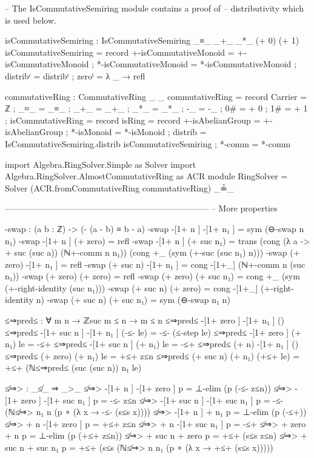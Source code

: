 \documentclass[11pt,a4paper]{article}
\begin{document}
\begin{code}
  -- The IsCommutativeSemiring module contains a proof of
  -- distributivity which is used below.

  isCommutativeSemiring : IsCommutativeSemiring _≡_ _+_ _*_ (+ 0) (+ 1)
  isCommutativeSemiring = record
    { +-isCommutativeMonoid = +-isCommutativeMonoid
    ; *-isCommutativeMonoid = *-isCommutativeMonoid
    ; distribʳ              = distribʳ
    ; zeroˡ                 = λ _ → refl
    }

commutativeRing : CommutativeRing _ _
commutativeRing = record
  { Carrier           = ℤ
  ; _≈_               = _≡_
  ; _+_               = _+_
  ; _*_               = _*_
  ; -_                = -_
  ; 0#                = + 0
  ; 1#                = + 1
  ; isCommutativeRing = record
    { isRing = record
      { +-isAbelianGroup = +-isAbelianGroup
      ; *-isMonoid       = *-isMonoid
      ; distrib          = IsCommutativeSemiring.distrib
                             isCommutativeSemiring
      }
    ; *-comm = *-comm
    }
  }

import Algebra.RingSolver.Simple as Solver
import Algebra.RingSolver.AlmostCommutativeRing as ACR
module RingSolver =
  Solver (ACR.fromCommutativeRing commutativeRing) _≟_

------------------------------------------------------------------------
-- More properties

-swap : (a b : ℤ) -> (- (a - b) ≡ b - a)
-swap -[1+ n ] -[1+ n₁ ] = sym (⊖-swap n n₁)
-swap -[1+ n ] (+ zero) = refl
-swap -[1+ n ] (+ suc n₁) = trans (cong (λ a -> + suc (suc a)) 
  (ℕ+-comm n n₁)) (cong +_ (sym (+-suc (suc n₁) n)))
-swap (+ zero) -[1+ n₁ ] = refl
-swap (+ suc n) -[1+ n₁ ] = cong -[1+_] (ℕ+-comm n (suc n₁))
-swap (+ zero) (+ zero) = refl
-swap (+ zero) (+ suc n₁) = cong +_ (sym (+-right-identity (suc n₁)))
-swap (+ suc n) (+ zero) = cong -[1+_] (+-right-identity n)
-swap (+ suc n) (+ suc n₁) = sym (⊖-swap n₁ n)

≤⇒pred≤ : ∀ m n → ℤsuc m ≤ n → m ≤ n
≤⇒pred≤ -[1+ zero ] -[1+ n₁ ] ()
≤⇒pred≤ -[1+ suc n ] -[1+ n₁ ] (-≤- le) = -≤- (≤-step le)
≤⇒pred≤ -[1+ zero ] (+ n₁) le = -≤+
≤⇒pred≤ -[1+ suc n ] (+ n₁) le = -≤+
≤⇒pred≤ (+ n) -[1+ n₁ ] ()
≤⇒pred≤ (+ zero) (+ n₁) le = +≤+ z≤n
≤⇒pred≤ (+ suc n) (+ n₁) (+≤+ le) = +≤+ (ℕ≤⇒pred≤ (suc (suc n)) n₁ le)

≰⇒> : _≰_ ⇒ _>_
≰⇒> { -[1+ n ]} { -[1+ zero ]} p = ⊥-elim (p (-≤- z≤n))
≰⇒> { -[1+ zero ]} { -[1+ suc n₁ ]} p = -≤- z≤n
≰⇒> { -[1+ suc n ]} { -[1+ suc n₁ ]} p = -≤- (ℕ≰⇒> {n₁} {n}
  (p ∘ (λ x → -≤- (s≤s x))))
≰⇒> { -[1+ n ]} {+ n₁} p = ⊥-elim (p (-≤+))
≰⇒> {+ n} { -[1+ zero ]} p = +≤+ z≤n
≰⇒> {+ n} { -[1+ suc n₁ ]} p = -≤+
≰⇒> {+ zero} {+ n} p = ⊥-elim (p (+≤+ z≤n))
≰⇒> {+ suc n} {+ zero} p = +≤+ (s≤s z≤n)
≰⇒> {+ suc n} {+ suc n₁} p = +≤+ (s≤s (ℕ≰⇒> {n} {n₁}
  (p ∘ (λ x → +≤+ (s≤s x)))))


\end{code}
\end{document}
